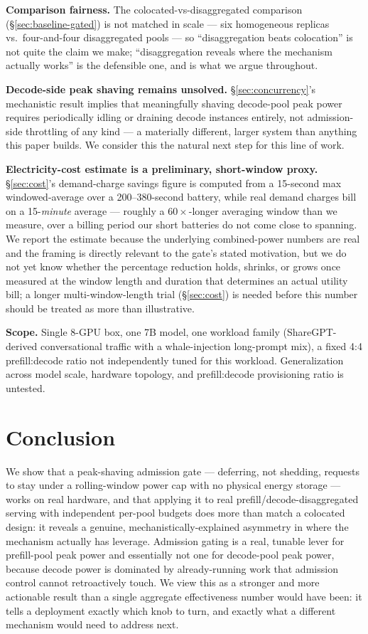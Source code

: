 \documentclass[sigconf,review,anonymous]{acmart}
\begin{document}
\textbf{Comparison fairness.} The colocated-vs-disaggregated comparison
(\S\ref{sec:baseline-gated}) is not matched in scale --- six homogeneous replicas vs.\
four-and-four disaggregated pools --- so ``disaggregation beats colocation'' is not quite the
claim we make; ``disaggregation reveals where the mechanism actually works'' is the
defensible one, and is what we argue throughout.

\textbf{Decode-side peak shaving remains unsolved.} \S\ref{sec:concurrency}'s mechanistic
result implies that meaningfully shaving decode-pool peak power requires periodically idling
or draining decode instances entirely, not admission-side throttling of any kind --- a
materially different, larger system than anything this paper builds. We consider this the
natural next step for this line of work.

\textbf{Electricity-cost estimate is a preliminary, short-window proxy.} \S\ref{sec:cost}'s
demand-charge savings figure is computed from a 15-second max windowed-average over a
200--380-second battery, while real demand charges bill on a 15-\emph{minute} average ---
roughly a $60\times$-longer averaging window than we measure, over a billing period our short
batteries do not come close to spanning. We report the estimate because the underlying
combined-power numbers are real and the framing is directly relevant to the gate's stated
motivation, but we do not yet know whether the percentage reduction holds, shrinks, or grows
once measured at the window length and duration that determines an actual utility bill; a
longer multi-window-length trial (\S\ref{sec:cost}) is needed before this number should be
treated as more than illustrative.

\textbf{Scope.} Single 8-GPU box, one 7B model, one workload family (ShareGPT-derived
conversational traffic with a whale-injection long-prompt mix), a fixed 4:4 prefill:decode
ratio not independently tuned for this workload. Generalization across model scale, hardware
topology, and prefill:decode provisioning ratio is untested.

\section{Conclusion}

We show that a peak-shaving admission gate --- deferring, not shedding, requests to stay
under a rolling-window power cap with no physical energy storage --- works on real hardware,
and that applying it to real prefill/decode-disaggregated serving with independent per-pool
budgets does more than match a colocated design: it reveals a genuine,
mechanistically-explained asymmetry in where the mechanism actually has leverage. Admission
gating is a real, tunable lever for prefill-pool peak power and essentially not one for
decode-pool peak power, because decode power is dominated by already-running work that
admission control cannot retroactively touch. We view this as a stronger and more actionable
result than a single aggregate effectiveness number would have been: it tells a deployment
exactly which knob to turn, and exactly what a different mechanism would need to address
next.



\end{document}

